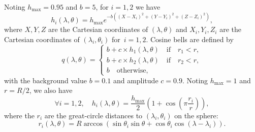 Noting $h_{\text{max}}=0.95$ and $b=5$, for $i=1,2$ we have
\begin{equation*}
 h_i(\lambda, \theta) =
 h_{\text{max}} e^{-b((X-X_i)^2+(Y-Y_i)^2+(Z-Z_i)^2)},
   \end{equation*}
   where $X,Y,Z$ are the Cartesian coordinates of $(\lambda, \theta)$
   and $X_i,Y_i,Z_i$ are the Cartesian coordinates of $(\lambda_i,
   \theta_i)$ for~${i=1,2}$.  Cosine bells are defined by
\begin{equation*}
  q(\lambda, \theta) =
  \begin{cases}
    b + c\times h_1(\lambda, \theta) \quad \text{if} \quad r_1 < r,\\
    b + c\times h_2(\lambda, \theta) \quad \text{if} \quad r_2 < r,\\
    b \quad \text{otherwise,}
  \end{cases}
   \end{equation*}
   with the background value $b=0.1$ and amplitude $c=0.9$. Noting
   $h_{\text{max}}=1$ and $r=R/2$, we also have
\begin{equation*}
  \forall i=1,2, \quad h_i(\lambda, \theta) =
  \displaystyle\frac{h_{\text{max}}}{2}\left(1+\cos\left(\pi\frac{r_i}{r}\right)\right),
\end{equation*}
where the $r_i$ are the great-circle distances to $(\lambda_i,\theta_i)$ on the
sphere:
\begin{equation*}
  r_i(\lambda, \theta)=R \arccos(\sin\theta_i\sin\theta +
  \cos\theta_i\cos(\lambda-\lambda_i)).
\end{equation*}

